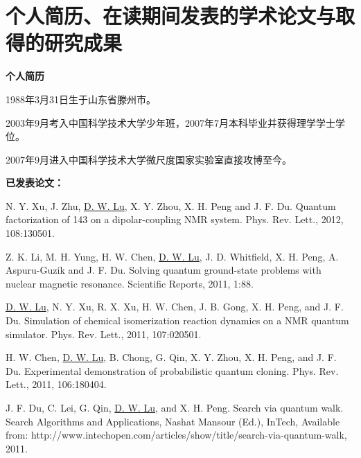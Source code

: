 ﻿
\chapter{个人简历、在读期间发表的学术论文与取得的研究成果}

\textbf{个人简历}

1988年3月31日生于山东省滕州市。

2003年9月考入中国科学技术大学少年班，2007年7月本科毕业并获得理学学士学位。

2007年9月进入中国科学技术大学微尺度国家实验室直接攻博至今。


\textbf{已发表论文：}

\begin{publications}

%
%

\item N. Y. Xu, J. Zhu, \underline{D. W. Lu}, X. Y. Zhou, X. H. Peng and J. F. Du. Quantum factorization of 143 on a dipolar-coupling NMR system. Phys. Rev. Lett., 2012, 108:130501.

\item Z. K. Li, M. H. Yung, H. W. Chen, \underline{D. W. Lu}, J. D. Whitfield, X. H. Peng, A. Aspuru-Guzik and J. F. Du. Solving quantum ground-state problems with nuclear magnetic resonance.
Scientific Reports, 2011, 1:88.

\item \underline{D. W. Lu}, N. Y. Xu, R. X. Xu, H. W. Chen, J. B. Gong, X. H. Peng, and J. F. Du.
Simulation of chemical isomerization reaction dynamics on a NMR quantum simulator.
Phys. Rev. Lett., 2011, 107:020501.

\item H. W. Chen, \underline{D. W. Lu}, B. Chong, G. Qin, X. Y. Zhou, X. H. Peng, and J. F. Du.
Experimental demonstration of probabilistic quantum cloning.
Phys. Rev. Lett., 2011, 106:180404.

\item J. F. Du, C. Lei, G. Qin, \underline{D. W. Lu}, and X. H. Peng. Search via quantum walk. Search Algorithms and Applications, Nashat Mansour (Ed.), InTech,  Available from: http://www.intechopen.com/articles/show/title/search-via-quantum-walk, 2011.


\end{publications}
